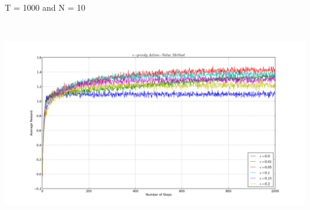 \documentclass[a4paper,10pt]{report}
\newenvironment{my_itemize}{
\begin{itemize}
  \setlength{\itemsep}{1pt}
  \setlength{\parskip}{0pt}
  \setlength{\parsep}{0pt}}{
\end{itemize}}
\begin{document}
\begin{my_itemize}
\item T = 1000 and N = 10
\begin{center}
\centerline{\includegraphics*[width=180mm, height=90mm]{EpsRew-10-1000.png}}


\end{center}
\end{my_itemize}
\end{document}
